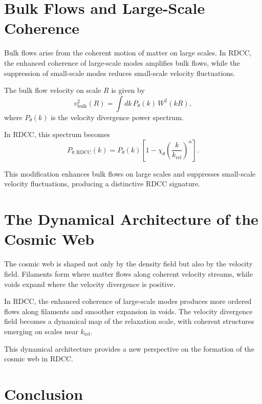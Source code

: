 \documentclass[11pt,a4paper]{article}
\begin{document}
\section{Bulk Flows and Large-Scale Coherence}

Bulk flows arise from the coherent motion of matter on large scales. In RDCC, the 
enhanced coherence of large-scale modes amplifies bulk flows, while the suppression 
of small-scale modes reduces small-scale velocity fluctuations.

The bulk flow velocity on scale $R$ is given by
\begin{equation}
    v_{\mathrm{bulk}}^{2}(R)
    = \int dk\,
      P_{\theta}(k)\,
      W^{2}(kR),
\end{equation}
where $P_{\theta}(k)$ is the velocity divergence power spectrum.

In RDCC, this spectrum becomes
\begin{equation}
    P_{\theta,\mathrm{RDCC}}(k)
    = P_{\theta}(k)
      \left[
        1 - \chi_{\theta}
        \left(\frac{k}{k_{\mathrm{rel}}}\right)^{\alpha}
      \right].
\end{equation}

This modification enhances bulk flows on large scales and suppresses small-scale 
velocity fluctuations, producing a distinctive RDCC signature.
\section{The Dynamical Architecture of the Cosmic Web}

The cosmic web is shaped not only by the density field but also by the velocity 
field. Filaments form where matter flows along coherent velocity streams, while 
voids expand where the velocity divergence is positive.

In RDCC, the enhanced coherence of large-scale modes produces more ordered flows 
along filaments and smoother expansion in voids. The velocity divergence field 
becomes a dynamical map of the relaxation scale, with coherent structures emerging 
on scales near $k_{\mathrm{rel}}$.

This dynamical architecture provides a new perspective on the formation of the 
cosmic web in RDCC.
\section{Conclusion}
\end{document}
